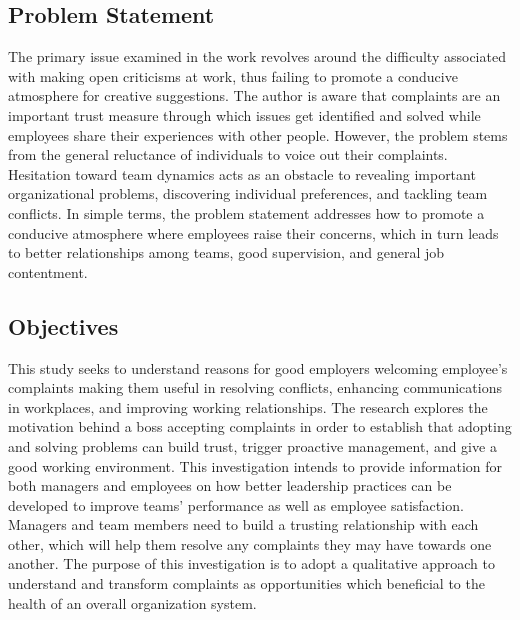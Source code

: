 \documentclass[a4paper,12pt]{report}
\begin{document}
\subsection{Problem Statement}
The primary issue examined in the work revolves around the difficulty associated with making open criticisms at work, thus failing to promote a conducive atmosphere for creative suggestions. The author is aware that complaints are an important trust measure through which issues get identified and solved while employees share their experiences with other people. However, the problem stems from the general reluctance of individuals to voice out their complaints. Hesitation toward team dynamics acts as an obstacle to revealing important organizational problems, discovering individual preferences, and tackling team conflicts. In simple terms, the problem statement addresses how to promote a conducive atmosphere where employees raise their concerns, which in turn leads to better relationships among teams, good supervision, and general job contentment.

\subsection{Objectives}
This study seeks to understand reasons for good employers welcoming employee’s complaints making them useful in resolving conflicts, enhancing communications in workplaces, and improving working relationships. The research explores the motivation behind a boss accepting complaints in order to establish that adopting and solving problems can build trust, trigger proactive management, and give a good working environment. This investigation intends to provide information for both managers and employees on how better leadership practices can be developed to improve teams’ performance as well as employee satisfaction. Managers and team members need to build a trusting relationship with each other, which will help them resolve any complaints they may have towards one another. The purpose of this investigation is to adopt a qualitative approach to understand and transform complaints as opportunities which beneficial to the health of an overall organization system\cite{complaint_to_opportunities}.

\newpage
\end{document}
